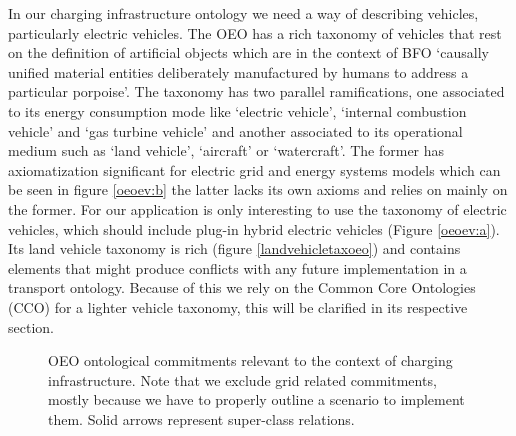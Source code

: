 In our charging infrastructure ontology we need a way of describing vehicles,
particularly electric vehicles. The OEO has a rich taxonomy of vehicles that
rest on the definition of artificial objects which are in the context of BFO
`causally unified material entities deliberately manufactured by humans to
address a particular porpoise'. The taxonomy has two parallel ramifications, one
associated to its energy consumption mode like `electric vehicle', `internal
combustion vehicle' and `gas turbine vehicle' and another associated to its
operational medium such as `land vehicle', `aircraft' or `watercraft'. The
former has axiomatization significant for electric grid and energy systems
models which can be seen in figure \ref{oeoev:b} the latter lacks its own axioms
and relies on mainly on the former. For our application is only interesting to
use the taxonomy of electric vehicles, which should include plug-in hybrid
electric vehicles (Figure \ref{oeoev:a}). Its land vehicle taxonomy is rich
(figure \ref{landvehicletaxoeo}) and contains elements that might produce
conflicts with any future implementation in a transport ontology. Because of
this we rely on the Common Core Ontologies (CCO) for a lighter vehicle taxonomy,
this will be clarified in its respective section.

\begin{figure}
    \centering
    \caption{OEO ontological commitments relevant to the context of charging infrastructure. Note that we exclude grid related commitments, mostly because we have to properly outline a scenario to implement them. Solid arrows represent super-class relations.}
\end{figure}

